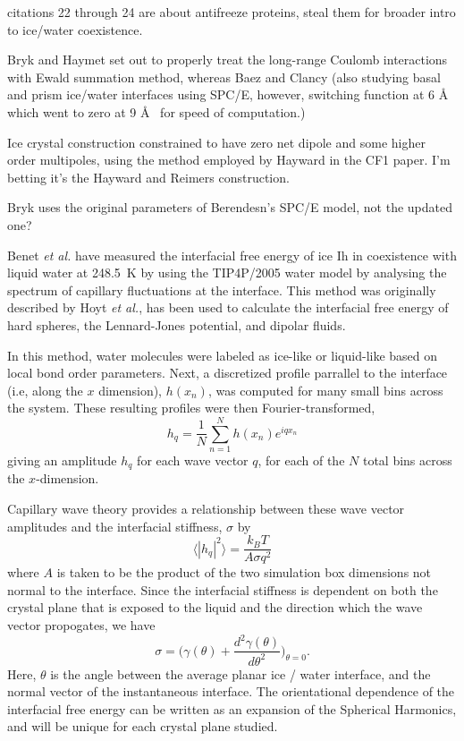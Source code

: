 citations 22 through 24 are about antifreeze proteins, steal them for
broader intro to ice/water coexistence. 

Bryk and Haymet set out to properly treat the long-range Coulomb
interactions with Ewald summation method, whereas Baez and Clancy
(also studying basal and prism ice/water interfaces using SPC/E,
however, switching function at 6 \AA~ which went to zero at 9 \AA~ for
speed of computation.) 

Ice crystal construction constrained to have zero net dipole and some
higher order multipoles, using the method employed by Hayward in the
CF1 paper. I'm betting it's the Hayward and Reimers construction. 

Bryk uses the original parameters of Berendesn's SPC/E model, not the
updated one?

Benet \textit{et al.} have measured the interfacial free energy of ice
Ih in coexistence with liquid water at 248.5~K by using the TIP4P/2005
water model by analysing the spectrum of capillary fluctuations at the
interface.\cite{Benet2014} This method was originally described by
Hoyt \textit{et al.}\cite{Hoyt2001}, has been used to calculate the
interfacial free energy of hard spheres,\cite{14} the Lennard-Jones
potential,\cite{15} and dipolar fluids.\cite{16}

In this method, water molecules were labeled as ice-like or
liquid-like based on local bond order parameters. Next, a discretized
profile parrallel to the interface (i.e, along the $x$ dimension),
$h(x_{n})$, was computed for many small bins across the system. These
resulting profiles were then Fourier-transformed,
\begin{equation}
h_{q} = \frac{1}{N}\sum_{n=1}^{N} h(x_{n})e^{iqx_n}
\end{equation}
giving an amplitude $h_{q}$ for each wave vector $q$, for each of the
$N$ total bins across the $x$-dimension. 

Capillary wave theory provides a relationship between these wave
vector amplitudes and the interfacial stiffness, $\sigma$ by
\begin{equation}
\langle |h_{q}|^{2} \rangle = \frac{k_{B}T}{A \sigma q^{2}}
\end{equation}
where $A$ is taken to be the product of the two simulation box
dimensions not normal to the interface. Since the interfacial
stiffness is dependent on both the crystal plane that is exposed to
the liquid and the direction which the wave vector propogates, we have
\begin{equation}
\sigma = \bigg(\gamma (\theta ) + \frac{d^{2}\gamma (\theta )}{d\theta
^{2}} \bigg)_{\theta = 0} .
\end{equation}
Here, $\theta$ is the angle between the average planar ice / water
interface, and the normal vector of the instantaneous interface. The
orientational dependence of the interfacial free energy can be written
as an expansion of the Spherical Harmonics\cite{23}, and will be
unique for each crystal plane studied. 

